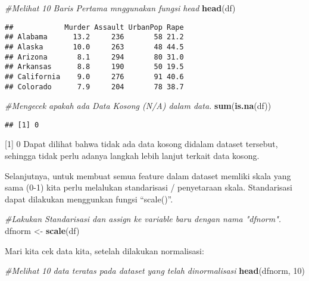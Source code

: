 \documentclass[]{article}
\newenvironment{Shaded}{\begin{snugshade}}{\end{snugshade}}
\newcommand{\CommentTok}[1]{\textcolor[rgb]{0.56,0.35,0.01}{\textit{#1}}}
\newcommand{\DecValTok}[1]{\textcolor[rgb]{0.00,0.00,0.81}{#1}}
\newcommand{\KeywordTok}[1]{\textcolor[rgb]{0.13,0.29,0.53}{\textbf{#1}}}
\newcommand{\NormalTok}[1]{#1}
\newcommand{\StringTok}[1]{\textcolor[rgb]{0.31,0.60,0.02}{#1}}
\begin{document}
\begin{Shaded}
\begin{Highlighting}[]
\CommentTok{#Melihat 10 Baris Pertama mnggunakan fungsi head}
\KeywordTok{head}\NormalTok{(df)}
\end{Highlighting}
\end{Shaded}

\begin{verbatim}
##            Murder Assault UrbanPop Rape
## Alabama      13.2     236       58 21.2
## Alaska       10.0     263       48 44.5
## Arizona       8.1     294       80 31.0
## Arkansas      8.8     190       50 19.5
## California    9.0     276       91 40.6
## Colorado      7.9     204       78 38.7
\end{verbatim}

\begin{Shaded}
\begin{Highlighting}[]
\CommentTok{#Mengecek apakah ada Data Kosong (N/A) dalam data. }
\KeywordTok{sum}\NormalTok{(}\KeywordTok{is.na}\NormalTok{(df))}
\end{Highlighting}
\end{Shaded}

\begin{verbatim}
## [1] 0
\end{verbatim}

{[}1{]} 0 Dapat dilihat bahwa tidak ada data kosong didalam dataset
tersebut, sehingga tidak perlu adanya langkah lebih lanjut terkait data
kosong.

Selanjutnya, untuk membuat semua feature dalam dataset memliki skala
yang sama (0-1) kita perlu melalukan standarisasi / penyetaraan skala.
Standarisasi dapat dilakukan menggunkan fungsi ``scale()''.

\begin{Shaded}
\begin{Highlighting}[]
\CommentTok{#Lakukan Standarisasi dan assign ke variable baru dengan nama "dfnorm".  }
\NormalTok{dfnorm <-}\StringTok{ }\KeywordTok{scale}\NormalTok{(df)}
\end{Highlighting}
\end{Shaded}

Mari kita cek data kita, setelah dilakukan normalisasi:

\begin{Shaded}
\begin{Highlighting}[]
\CommentTok{#Melihat 10 data teratas pada dataset yang telah dinormalisasi}
\KeywordTok{head}\NormalTok{(dfnorm, }\DecValTok{10}\NormalTok{)}
\end{Highlighting}
\end{Shaded}
\end{document}
